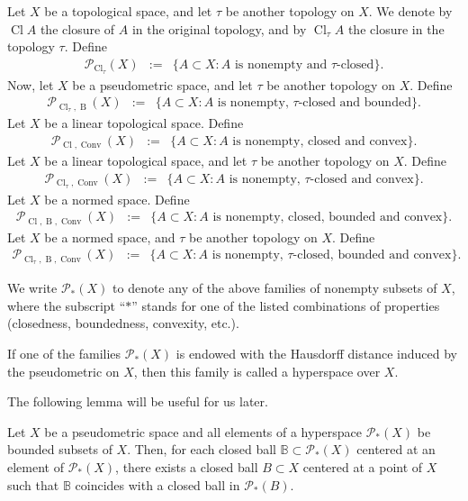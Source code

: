 \documentclass{svproc}
\def\Cl{\operatorname{Cl}}
\def\Conv{\operatorname{Conv}}
\def\B{\operatorname{B}}
\begin{document}
Let $X$ be a topological space, and let $\tau$ be another topology on $X$. We denote by $\Cl A$ the closure of $A$ in the original topology, and by $\Cl_{\tau} A$ the closure in the topology $\tau$. Define 
\begin{eqnarray*}
  \mathcal{P}_{\Cl_{\tau}}(X)&:=&\{A\subset X\colon A\text{ is nonempty and $\tau$-closed}\}.
\end{eqnarray*}
Now, let $X$ be a pseudometric space, and let $\tau$ be another topology on $X$. Define
\begin{eqnarray*}
  \mathcal{P}_{\Cl_{\tau}, \B}(X)&:=&\{A\subset X\colon A\text{ is nonempty, $\tau$-closed and bounded}\}.
\end{eqnarray*}
Let $X$ be a linear topological space. Define
\begin{eqnarray*}
  \mathcal{P}_{\Cl, \Conv}(X)&:=&\{A\subset X\colon A\text{ is nonempty, closed and convex}\}.
\end{eqnarray*}
Let $X$ be a linear topological space, and let $\tau$ be another topology on $X$. Define
\begin{eqnarray*}
  \mathcal{P}_{\Cl_{\tau}, \Conv}(X)&:=&\{A\subset X\colon A\text{ is nonempty, $\tau$-closed and convex}\}.
\end{eqnarray*}
Let $X$ be a normed space. Define
\begin{eqnarray*}
  \mathcal{P}_{\Cl, \B, \Conv}(X)&:=&\{A\subset X\colon A\text{ is nonempty, closed, bounded and convex}\}.
\end{eqnarray*}
Let $X$ be a normed space, and $\tau$ be another topology on $X$. Define
\begin{eqnarray*}
  \mathcal{P}_{\Cl_{\tau}, \B, \Conv}(X)&:=&\{A\subset X\colon A\text{ is nonempty, $\tau$-closed, bounded and convex}\}.
\end{eqnarray*}

We write $\mathcal{P}_{*}(X)$ to denote any of the above families of nonempty subsets of $X$, where the subscript ``$*$'' stands for one of the listed combinations of properties (closedness, boundedness, convexity, etc.).

\begin{definition}\label{dfn:hyperspace}
If one of the families $\mathcal{P}_{*}(X)$ is endowed with the Hausdorff distance induced by the pseudometric on $X$, then this family is called a hyperspace over $X$.
\end{definition}

The following lemma will be useful for us later.

\begin{lemma}\label{lem:ball}
Let $X$ be a pseudometric space and all elements of a hyperspace $\mathcal{P}_{*}(X)$ be bounded subsets of $X$. Then, for each closed ball $\mathbb{B}\subset \mathcal{P}_{*}(X)$ centered at an element of $\mathcal{P}_{*}(X)$, there exists a closed ball $B\subset X$ centered at a point of $X$ such that $\mathbb{B}$ coincides with a closed ball in $\mathcal{P}_{*}(B).$
\end{lemma}
\end{document}
